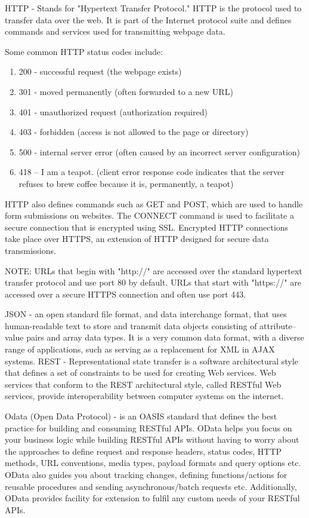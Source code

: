 \par HTTP - Stands for "Hypertext Transfer Protocol." HTTP is the protocol used to transfer data over the web. It is part of the Internet protocol suite and defines commands and services used for transmitting webpage data.
\par Some common HTTP status codes include: 
\begin{enumerate}
	\item 200 - successful request (the webpage exists) 
	\item 301 - moved permanently (often forwarded to a new URL) 
	\item 401 - unauthorized request (authorization required) 
	\item 403 - forbidden (access is not allowed to the page or directory) 
	\item 500 - internal server error (often caused by an incorrect server configuration) 
	\item 418 – I am a teapot. (client error response code indicates that the server refuses to brew coffee because it is, permanently, a teapot) 
\end{enumerate}
\par HTTP also defines commands such as GET and POST, which are used to handle form submissions on websites. The CONNECT command is used to facilitate a secure connection that is encrypted using SSL. Encrypted HTTP connections take place over HTTPS, an extension of HTTP designed for secure data transmissions. 
\par NOTE: URLs that begin with "http://" are accessed over the standard hypertext transfer protocol and use port 80 by default. URLs that start with "https://" are accessed over a secure HTTPS connection and often use port 443. 
\par JSON - an open standard file format, and data interchange format, that uses human-readable text to store and transmit data objects consisting of attribute–value pairs and array data types. It is a very common data format, with a diverse range of applications, such as serving as a replacement for XML in AJAX systems. 
REST - Representational state transfer is a software architectural style that defines a set of constraints to be used for creating Web services. Web services that conform to the REST architectural style, called RESTful Web services, provide interoperability between computer systems on the internet. 

Odata (Open Data Protocol) - is an OASIS standard that defines the best practice for building and consuming RESTful APIs. OData helps you focus on your business logic while building RESTful APIs without having to worry about the approaches to define request and response headers, status codes, HTTP methods, URL conventions, media types, payload formats and query options etc. OData also guides you about tracking changes, defining functions/actions for reusable procedures and sending asynchronous/batch requests etc. Additionally, OData provides facility for extension to fulfil any custom needs of your RESTful APIs. 

